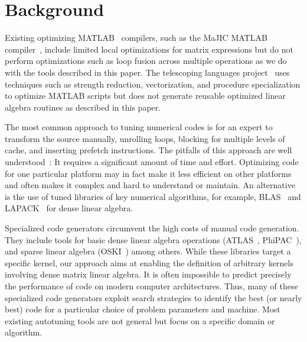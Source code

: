 \documentclass[runningheads]{llncs}
\begin{document}
\section{Background}
\label{sec:background}

Existing optimizing MATLAB~\cite{matlab:webpage} compilers, such as the MaJIC
MATLAB compiler~\cite{MaJIC}, include limited local optimizations for matrix
expressions but do not perform optimizations such as loop fusion across
multiple operations as we do with the tools described in this paper. The
telescoping languages
project~\cite{telescopingurl} uses techniques such as
strength reduction, vectorization, and procedure specialization to optimize
MATLAB scripts but does not generate reusable optimized linear algebra
routines as described in this paper.

The most common approach to tuning numerical codes is for an expert to
transform the source manually, unrolling loops, blocking for multiple levels
of cache, and inserting prefetch instructions.  The pitfalls of this approach
are well understood~\cite{Goedecker01}: It requires a significant amount of
time and effort. Optimizing code for one particular platform may in fact make
it less efficient on other platforms and often makes it complex and hard to
understand or maintain.  An alternative is the use of tuned libraries of key
numerical algorithms, for example, BLAS~\cite{Dongarra:1990fk} and
LAPACK~\cite{LAPACK} for dense linear algebra.

Specialized code generators circumvent the high costs of manual code
generation. They include tools for basic dense linear algebra operations
(ATLAS~\cite{WN147}, PhiPAC~\cite{bilmes97optimizing}),
and sparse linear algebra (OSKI~\cite{vuduc05})
%
among others.  While these libraries target a specific kernel, our approach aims 
at enabling the definition of arbitrary kernels involving dense matrix linear algebra.
It is often impossible to predict precisely the performance of code
on modern computer architectures. Thus, many of these specialized code
generators exploit search strategies to identify the best (or nearly best)
code for a particular choice of problem parameters and machine. Most existing
autotuning tools are not general but focus on a specific domain or algorithm.
\end{document}
